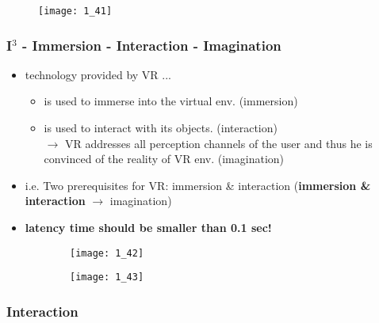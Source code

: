 \documentclass{standalone}
\begin{document}
\begin{figure}[h]
	\texttt{[image: 1\_41]}
\end{figure}

\subsubsection*{I$^3$ - Immersion - Interaction - Imagination}

\begin{itemize}
	\item technology provided by VR ...
		\begin{itemize}
			\item is used to immerse into the virtual env. (immersion)
			\item is used to interact with its objects. (interaction)
			\\ $\rightarrow$ VR addresses all perception channels of the user and thus he is convinced of the reality of VR env. (imagination)
		\end{itemize}
	\item i.e. Two prerequisites for VR: immersion \& interaction (\textbf{immersion \& interaction} $\rightarrow$ imagination)
	\item \textbf{latency time should be smaller than 0.1 sec!}
\end{itemize}

\begin{figure}[H]
	\centering
	\begin{subfigure}[b]{0.45\textwidth}	
		\texttt{[image: 1\_42]}
	\end{subfigure}
	\begin{subfigure}[b]{0.45\textwidth}	
		\texttt{[image: 1\_43]}
	\end{subfigure}
\end{figure}

\subsubsection*{Interaction}
\end{document}
